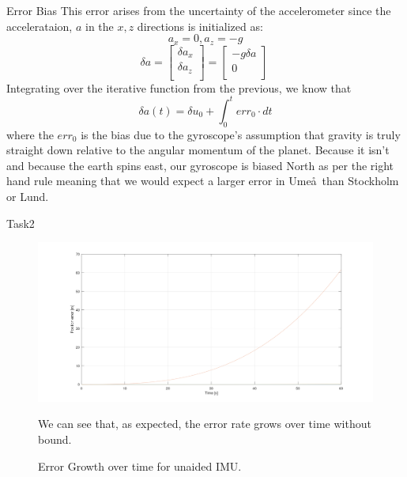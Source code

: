 \documentclass[10pt]{beamer}
\theoremstyle{definition}
\begin{document}
\begin{frame}{Error Bias}
    This error arises from the uncertainty of the accelerometer since the accelerataion, $a$ in the $x,z$ directions is initialized as:
    $$
    a_x = 0, a_z = -g
    $$
    $$
    \delta a = 
    \begin{bmatrix}
        \delta a_x \\
        \delta a_z \\
    \end{bmatrix} = 
    \begin{bmatrix} 
        -g \delta a \\
        0           \\
    \end{bmatrix}
    \
    $$
    Integrating over the iterative function from the previous, we know that
    $$
    \delta a(t) = \delta u_0 + \int_0^t err_0 \cdot dt
    $$
    where the $err_0$ is the bias due to the gyroscope's assumption that gravity is truly straight down relative to the angular momentum of the planet. Because it isn't and because the earth spins east, our gyroscope is biased North as per the right hand rule meaning that we would expect a larger error in Ume\aa~than Stockholm or Lund.
\end{frame}
\begin{frame}{Task2}
\begin{figure}
    \includegraphics[width=.8\textwidth]{images/error_growth.png}
    \caption{Error Growth over time for unaided IMU.}
    \label{fig:my_label}
    We can see that, as expected, the error rate grows over time without bound.
\end{figure}

\end{frame}
\end{document}
